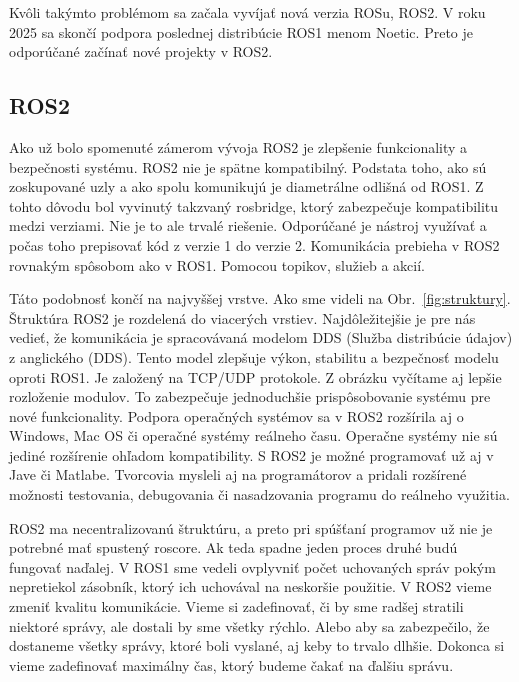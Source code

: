 Kvôli takýmto problémom sa začala vyvíjať nová verzia ROSu, ROS2. V roku 2025 sa skončí podpora poslednej distribúcie ROS1 menom Noetic.
Preto je odporúčané začínať nové projekty v ROS2.

\subsection{ROS2}

Ako už bolo spomenuté zámerom vývoja ROS2 je zlepšenie funkcionality a bezpečnosti systému. ROS2 nie je spätne kompatibilný.
Podstata toho, ako sú zoskupované uzly a ako spolu komunikujú je diametrálne odlišná od ROS1. Z tohto dôvodu bol vyvinutý takzvaný rosbridge,
ktorý zabezpečuje kompatibilitu medzi verziami. Nie je to ale trvalé riešenie. Odporúčané je nástroj využívať a počas toho prepisovať kód
z verzie 1 do verzie 2. Komunikácia prebieha \newline v ROS2 rovnakým spôsobom ako v ROS1. Pomocou topikov, služieb a akcií.

Táto podobnosť končí na najvyššej vrstve. Ako sme videli na Obr.~\ref{fig:struktury}. Štruktúra ROS2 je rozdelená do viacerých vrstiev.
Najdôležitejšie je pre nás vedieť, že komunikácia je spracovávaná modelom DDS (Služba distribúcie údajov) z anglického (\acrlong{DDS}). Tento model zlepšuje výkon, stabilitu
a bezpečnosť modelu oproti ROS1. Je založený na TCP/UDP protokole. Z obrázku vyčítame aj lepšie rozloženie modulov. To zabezpečuje jednoduchšie
prispôsobovanie systému pre nové funkcionality. Podpora operačných systémov sa v ROS2 rozšírila aj o Windows, Mac OS či operačné systémy reálneho času.
Operačne systémy nie sú jediné rozšírenie ohľadom kompatibility. S ROS2 je možné programovať už aj v Jave či Matlabe.
Tvorcovia mysleli aj na programátorov a pridali rozšírené možnosti testovania, debugovania či nasadzovania programu do reálneho využitia.

ROS2 ma necentralizovanú štruktúru, a preto pri spúšťaní programov už nie je potrebné mať spustený roscore. Ak teda spadne
jeden proces druhé budú fungovať naďalej. V ROS1 sme vedeli ovplyvniť počet uchovaných správ pokým nepretiekol zásobník, ktorý ich uchovával na neskoršie použitie.
V ROS2 vieme zmeniť kvalitu komunikácie. Vieme si zadefinovať, či by sme radšej stratili niektoré správy, ale dostali by sme všetky rýchlo. Alebo aby sa zabezpečilo,
že dostaneme všetky správy, ktoré boli vyslané, aj keby to trvalo dlhšie. Dokonca si vieme zadefinovať maximálny čas, ktorý budeme čakať na ďalšiu správu.


